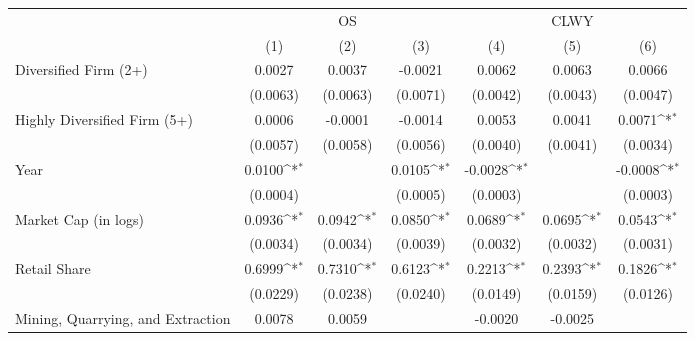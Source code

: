 {
\def\sym#1{\ifmmode^{#1}\else\(^{#1}\)\fi}
\begin{tabular}{l*{6}{c}}
\hline\hline
                    &\multicolumn{3}{c}{OS}                                     &\multicolumn{3}{c}{CLWY}                                   \\\cmidrule(lr){2-4}\cmidrule(lr){5-7}
                    &\multicolumn{1}{c}{(1)}       &\multicolumn{1}{c}{(2)}       &\multicolumn{1}{c}{(3)}       &\multicolumn{1}{c}{(4)}       &\multicolumn{1}{c}{(5)}       &\multicolumn{1}{c}{(6)}       \\
\hline
Diversified Firm (2+)&      0.0027       &      0.0037       &     -0.0021       &      0.0062       &      0.0063       &      0.0066       \\
                    &    (0.0063)       &    (0.0063)       &    (0.0071)       &    (0.0042)       &    (0.0043)       &    (0.0047)       \\
Highly Diversified Firm (5+)&      0.0006       &     -0.0001       &     -0.0014       &      0.0053       &      0.0041       &      0.0071\sym{*}\\
                    &    (0.0057)       &    (0.0058)       &    (0.0056)       &    (0.0040)       &    (0.0041)       &    (0.0034)       \\
Year                &      0.0100\sym{*}&                   &      0.0105\sym{*}&     -0.0028\sym{*}&                   &     -0.0008\sym{*}\\
                    &    (0.0004)       &                   &    (0.0005)       &    (0.0003)       &                   &    (0.0003)       \\
Market Cap (in logs)&      0.0936\sym{*}&      0.0942\sym{*}&      0.0850\sym{*}&      0.0689\sym{*}&      0.0695\sym{*}&      0.0543\sym{*}\\
                    &    (0.0034)       &    (0.0034)       &    (0.0039)       &    (0.0032)       &    (0.0032)       &    (0.0031)       \\
Retail Share        &      0.6999\sym{*}&      0.7310\sym{*}&      0.6123\sym{*}&      0.2213\sym{*}&      0.2393\sym{*}&      0.1826\sym{*}\\
                    &    (0.0229)       &    (0.0238)       &    (0.0240)       &    (0.0149)       &    (0.0159)       &    (0.0126)       \\
Mining, Quarrying, and Extraction&      0.0078       &      0.0059       &                   &     -0.0020       &     -0.0025       &                   \\

\end{tabular}}
